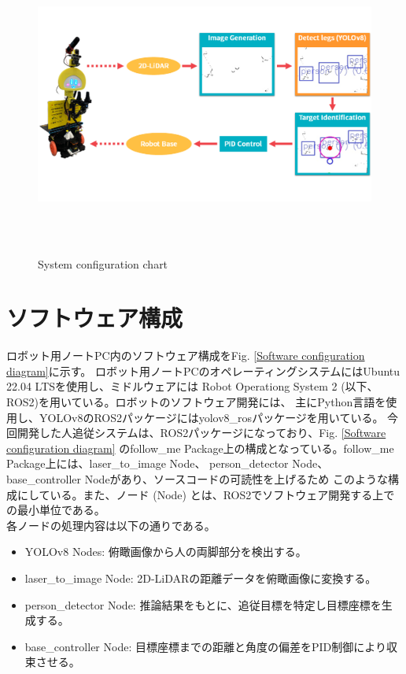 \begin{figure}[h]
    \begin{center}
    \includegraphics[height=100mm,clip]{figure/System-configration-chart.png}
    \caption{System configuration chart}
    \label{System configuration chart}
    \end{center}
\end{figure}

\section{ソフトウェア構成}
ロボット用ノートPC内のソフトウェア構成をFig. \ref{Software configuration diagram}に示す。
ロボット用ノートPCのオペレーティングシステムにはUbuntu 22.04 LTSを使用し、ミドルウェアには
Robot Operationg System 2 (以下、ROS2)を用いている。ロボットのソフトウェア開発には、
主にPython言語を使用し、YOLOv8のROS2パッケージにはyolov8\_rosパッケージを用いている。
今回開発した人追従システムは、ROS2パッケージになっており、Fig. \ref{Software configuration diagram}
のfollow\_me Package上の構成となっている。follow\_me Package上には、laser\_to\_image Node、
person\_detector Node、base\_controller Nodeがあり、ソースコードの可読性を上げるため
このような構成にしている。また、ノード (Node) とは、ROS2でソフトウェア開発する上での最小単位である。\\ \indent
各ノードの処理内容は以下の通りである。

\begin{itemize}
    \item YOLOv8 Nodes: 俯瞰画像から人の両脚部分を検出する。
    \item laser\_to\_image Node: 2D-LiDARの距離データを俯瞰画像に変換する。
    \item person\_detector Node: 推論結果をもとに、追従目標を特定し目標座標を生成する。
    \item base\_controller Node: 目標座標までの距離と角度の偏差をPID制御により収束させる。
\end{itemize}

